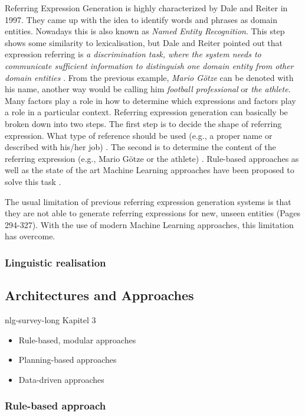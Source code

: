 Referring Expression Generation is highly characterized by Dale and Reiter in 1997. They came up with the idea to identify words and phrases as domain entities. Nowadays this is also known as \textit{Named Entity Recognition}. This step shows some similarity to lexicalisation, but Dale and Reiter pointed out that expression referring is \textit{a discrimination task, where the system needs to communicate sufficient information to distinguish one domain entity from other domain entities} \cite{reiter2}. From the previous example, \textit{Mario Götze} can be denoted with his name, another way would be calling him \textit{football professional} or \textit{the athlete}. Many factors play a role in how to determine which expressions and factors play a role in a particular context. Referring expression generation can basically be broken down into two steps.
The first step is to decide the shape of referring expression. What type of reference should be used (e.g., a proper name or described with his/her job) \cite{named}. The second is to determine the content of the referring expression (e.g., Mario Götze or the athlete) \cite{named}.
Rule-based approaches as well as the state of the art Machine Learning approaches have been proposed to solve this task \cite{reiter2}.  

The usual limitation of previous referring expression generation systems is that they are not able to generate referring expressions for new, unseen entities \cite{anja} (Pages 294-327). With the use of modern Machine Learning approaches, this limitation has overcome.
\subsubsection{Linguistic realisation}


\subsection{Architectures and Approaches}\label{ss:archi}


nlg-survey-long Kapitel 3

\begin{itemize}
	\item Rule-based, modular approaches
	\item Planning-based approaches
	\item Data-driven approaches
\end{itemize}

\subsubsection{Rule-based approach}
